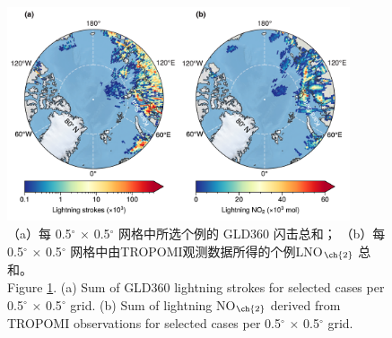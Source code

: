 \begin{figure}[H]
\centering
\includegraphics[width=0.9\textwidth]{./figures/arctic_lno2_production.png}
\caption{
（a）每 0.5$^{\circ}$ $\times$ 0.5$^{\circ}$ 网格中所选个例的 GLD360 闪击总和；
（b）每 0.5$^{\circ}$ $\times$ 0.5$^{\circ}$ 网格中由TROPOMI观测数据所得的个例LNO$_{\ch{2}}$ 总和。\\
Figure \ref{fig:arctic_lno2_production}. (a) Sum of GLD360 lightning strokes for selected cases per 0.5$^{\circ}$ $\times$ 0.5$^{\circ}$ grid.
(b) Sum of lightning NO$_{\ch{2}}$ derived from TROPOMI observations for selected cases per 0.5$^{\circ}$ $\times$ 0.5$^{\circ}$ grid.
}
\label{fig:arctic_lno2_production}
\end{figure}

